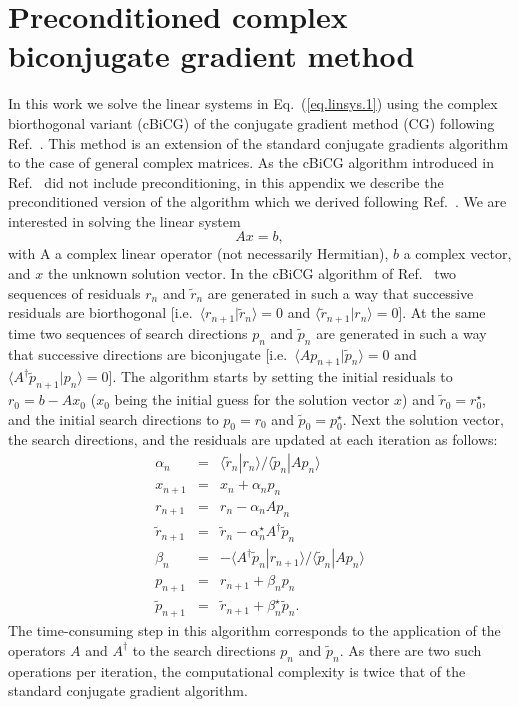 \documentclass[twocolumn,prb,showpacs,superscriptaddress]{revtex4}
\def\>{\rangle}
\def\<{\langle}
\def\rt{\tilde{r}}
\def\pt{\tilde{p}}
\begin{document}
\appendix

\section{Preconditioned complex biconjugate gradient method}\label{app.cbcg}

In this work we solve the linear systems in Eq.\ (\ref{eq.linsys.1}) 
using the complex biorthogonal variant (cBiCG) of the conjugate gradient method (CG)
following Ref.\ . This method is an extension of the standard
conjugate gradients algorithm to the
case of general complex matrices.
As the cBiCG algorithm introduced in Ref.\  
did not include preconditioning, in this appendix we describe 
the preconditioned version of the algorithm which we derived 
following Ref.~.
%
We are interested in solving the linear system
  \begin{equation}\label{eq.axeqb}
  Ax=b,
  \end{equation}
with A a complex linear operator (not necessarily Hermitian), $b$ a complex 
vector, and $x$ the unknown solution vector.
In the cBiCG algorithm of Ref.\  two sequences of residuals $r_n$ and
$\rt_n$ are generated in such a way that successive residuals 
are biorthogonal [i.e.\ $\<r_{n+1}|\rt_n\>=0$ and $\<\rt_{n+1}|r_n\>=0$].
At the same time two sequences of search directions 
$p_n$ and $\pt_n$ are generated in such a way that successive directions
are biconjugate [i.e.\ $\< A p_{n+1}|\pt_n \> =0$ and 
$\< A^\dagger \pt_{n+1}|p_n \> =0$].
The algorithm starts by setting the initial residuals to
$r_0 = b-Ax_0$ ($x_0$ being the initial guess for the solution vector $x$) 
and $\rt_0=r_0^\star$, and the initial search directions to $p_0=r_0$ 
and $\pt_0=p_0^\star$. Next the solution
vector, the search directions, and the residuals are updated at each
iteration as follows:
  \begin{eqnarray}
  \alpha_n & = & \<\rt_n|r_n\>/\<\pt_n|Ap_n\> \label{eq.cg1}  \\ 
  x_{n+1} & = & x_n + \alpha_n p_n \label{eq.cg2} \\ 
  r_{n+1} & = & r_n - \alpha_n Ap_n \label{eq.cg3} \\ 
  \rt_{n+1} & = & \rt_n - \alpha_n^\star A^\dagger \pt_n \label{eq.cg4}\\ 
  \beta_n & = & - \<A^\dagger\pt_n|r_{n+1}\>/\<\pt_n|Ap_n\> \label{eq.cg5}\\ 
  p_{n+1} & = & r_{n+1} + \beta_n p_n \label{eq.cg6}\\ 
  \pt_{n+1} & = & \rt_{n+1} + \beta_n^\star \label{eq.cg7} \pt_n. 
  \end{eqnarray}
The time-consuming step in this algorithm corresponds to the application of the operators
$A$ and $A^\dagger$ to the search directions $p_n$ and $\pt_n$. 
As there are two such operations per iteration, the computational complexity 
is twice that of the standard conjugate gradient algorithm.
\end{document}
